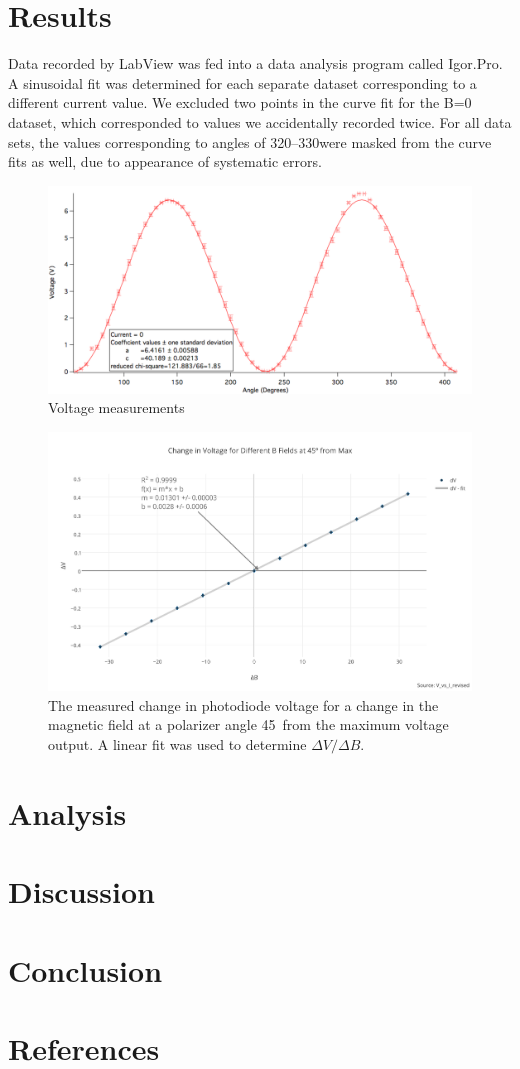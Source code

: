 \documentclass[prb,preprint]{revtex4-1}
\begin{document}
\section{Results}
{Data recorded by LabView was fed into a data analysis program called Igor.Pro.  A sinusoidal fit was determined for each separate dataset corresponding to a different current value.  We excluded two points in the curve fit for the B=0 dataset, which corresponded to values we accidentally recorded twice. For all data sets, the values corresponding to angles of 320\degree--330\degree were masked from the curve fits as well, due to appearance of systematic errors. 
\begin{figure}
\includegraphics[width = 6.5in]{0A.pdf}
\caption{\label{nofield}Voltage measurements }

\end{figure}

\begin{figure}[b]
\includegraphics[width =6.5in]{change_in_voltage_for_different_b_fields_at_45_from_max.pdf}
\caption{\label{method2pic} The measured change in photodiode voltage for a change in the magnetic field at a polarizer angle 45\degree\  from the maximum voltage output. A linear fit was used to determine $\Delta V/\Delta B$.}
\end{figure}
}
\section{Analysis}


\section{Discussion}




\section{Conclusion}


\section{References}
\end{document}
